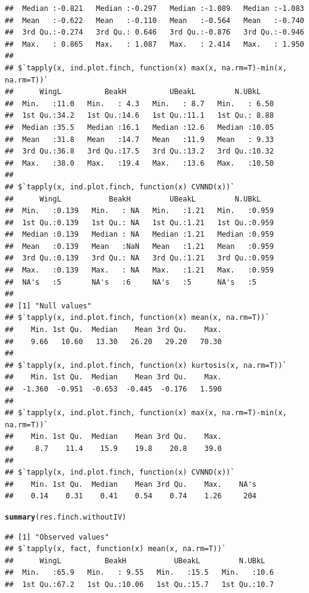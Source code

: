 \documentclass[12pt]{article}\usepackage[]{graphicx}\usepackage[]{color}
\makeatletter
\newcommand{\hlstd}[1]{\textcolor[rgb]{0.345,0.345,0.345}{#1}}%
\newcommand{\hlkwd}[1]{\textcolor[rgb]{0.737,0.353,0.396}{\textbf{#1}}}%
\newenvironment{kframe}{%
 \def\at@end@of@kframe{}%
 \ifinner\ifhmode%
  \def\at@end@of@kframe{\end{minipage}}%
  \begin{minipage}{\columnwidth}%
 \fi\fi%
 \def\FrameCommand##1{\hskip\@totalleftmargin \hskip-\fboxsep
 \colorbox{shadecolor}{##1}\hskip-\fboxsep
     \hskip-\linewidth \hskip-\@totalleftmargin \hskip\columnwidth}%
 \MakeFramed {\advance\hsize-\width
   \@totalleftmargin\z@ \linewidth\hsize
   \@setminipage}}%
 {\par\unskip\endMakeFramed%
 \at@end@of@kframe}
\newenvironment{knitrout}{}{} %
\makeatother
\begin{document}
\begin{knitrout}
\begin{kframe}
\begin{verbatim}
##  Median :-0.821   Median :-0.297   Median :-1.089   Median :-1.083  
##  Mean   :-0.622   Mean   :-0.110   Mean   :-0.564   Mean   :-0.740  
##  3rd Qu.:-0.274   3rd Qu.: 0.646   3rd Qu.:-0.876   3rd Qu.:-0.946  
##  Max.   : 0.865   Max.   : 1.087   Max.   : 2.414   Max.   : 1.950  
## 
## $`tapply(x, ind.plot.finch, function(x) max(x, na.rm=T)-min(x, na.rm=T))`
##      WingL          BeakH          UBeakL         N.UBkL     
##  Min.   :11.0   Min.   : 4.3   Min.   : 8.7   Min.   : 6.50  
##  1st Qu.:34.2   1st Qu.:14.6   1st Qu.:11.1   1st Qu.: 8.88  
##  Median :35.5   Median :16.1   Median :12.6   Median :10.05  
##  Mean   :31.8   Mean   :14.7   Mean   :11.9   Mean   : 9.33  
##  3rd Qu.:36.8   3rd Qu.:17.5   3rd Qu.:13.2   3rd Qu.:10.32  
##  Max.   :38.0   Max.   :19.4   Max.   :13.6   Max.   :10.50  
## 
## $`tapply(x, ind.plot.finch, function(x) CVNND(x))`
##      WingL           BeakH         UBeakL         N.UBkL     
##  Min.   :0.139   Min.   : NA   Min.   :1.21   Min.   :0.959  
##  1st Qu.:0.139   1st Qu.: NA   1st Qu.:1.21   1st Qu.:0.959  
##  Median :0.139   Median : NA   Median :1.21   Median :0.959  
##  Mean   :0.139   Mean   :NaN   Mean   :1.21   Mean   :0.959  
##  3rd Qu.:0.139   3rd Qu.: NA   3rd Qu.:1.21   3rd Qu.:0.959  
##  Max.   :0.139   Max.   : NA   Max.   :1.21   Max.   :0.959  
##  NA's   :5       NA's   :6     NA's   :5      NA's   :5      
## 
## [1] "Null values"
## $`tapply(x, ind.plot.finch, function(x) mean(x, na.rm=T))`
##    Min. 1st Qu.  Median    Mean 3rd Qu.    Max. 
##    9.66   10.60   13.30   26.20   29.20   70.30 
## 
## $`tapply(x, ind.plot.finch, function(x) kurtosis(x, na.rm=T))`
##    Min. 1st Qu.  Median    Mean 3rd Qu.    Max. 
##  -1.360  -0.951  -0.653  -0.445  -0.176   1.590 
## 
## $`tapply(x, ind.plot.finch, function(x) max(x, na.rm=T)-min(x, na.rm=T))`
##    Min. 1st Qu.  Median    Mean 3rd Qu.    Max. 
##     8.7    11.4    15.9    19.8    20.8    39.0 
## 
## $`tapply(x, ind.plot.finch, function(x) CVNND(x))`
##    Min. 1st Qu.  Median    Mean 3rd Qu.    Max.    NA's 
##    0.14    0.31    0.41    0.54    0.74    1.26     204
\end{verbatim}
\begin{alltt}
\hlkwd{summary}\hlstd{(res.finch.withoutIV)}
\end{alltt}
\begin{verbatim}
## [1] "Observed values"
## $`tapply(x, fact, function(x) mean(x, na.rm=T))`
##      WingL          BeakH           UBeakL         N.UBkL    
##  Min.   :65.9   Min.   : 9.55   Min.   :15.5   Min.   :10.6  
##  1st Qu.:67.2   1st Qu.:10.06   1st Qu.:15.7   1st Qu.:10.7  

\end{verbatim}
\end{kframe}
\end{knitrout}
\end{document}
